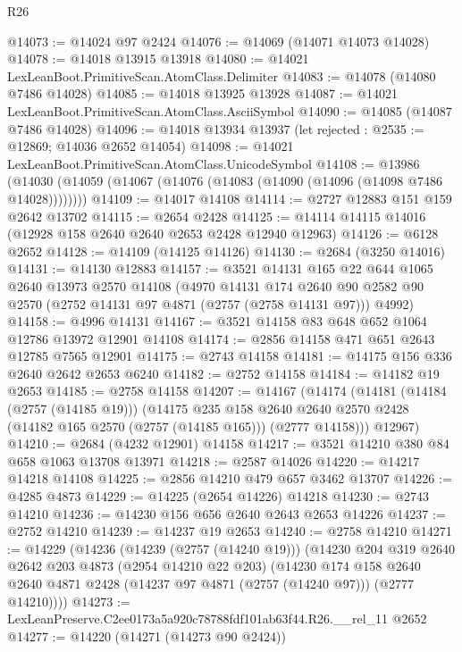 \begin{lexlean}{R26}
\begin{coremodule}
@14073 := @14024 @97 @2424
@14076 := @14069 (@14071 @14073 @14028)
@14078 := @14018 @13915 @13918
@14080 := @14021 LexLeanBoot.PrimitiveScan.AtomClass.Delimiter
@14083 := @14078 (@14080 @7486 @14028)
@14085 := @14018 @13925 @13928
@14087 := @14021 LexLeanBoot.PrimitiveScan.AtomClass.AsciiSymbol
@14090 := @14085 (@14087 @7486 @14028)
@14096 := @14018 @13934 @13937 (let rejected : @2535 := @12869; @14036 @2652 @14054)
@14098 := @14021 LexLeanBoot.PrimitiveScan.AtomClass.UnicodeSymbol
@14108 := @13986
    (@14030 (@14059 (@14067 (@14076 (@14083 (@14090 (@14096 (@14098 @7486 @14028))))))))
@14109 := @14017 @14108
@14114 := @2727 @12883 @151 @159 @2642 @13702
@14115 := @2654 @2428
@14125 := @14114 @14115 @14016 (@12928 @158 @2640 @2640 @2653 @2428 @12940 @12963)
@14126 := @6128 @2652
@14128 := @14109 (@14125 @14126)
@14130 := @2684 (@3250 @14016)
@14131 := @14130 @12883
@14157 := @3521
    @14131
    @165
    @22
    @644
    @1065
    @2640
    @13973
    @2570
    @14108
    (@4970
      @14131
      @174
      @2640
      @90
      @2582
      @90
      @2570
      (@2752 @14131 @97 @4871 (@2757 (@2758 @14131 @97)))
      @4992)
@14158 := @4996 @14131
@14167 := @3521 @14158 @83 @648 @652 @1064 @12786 @13972 @12901 @14108
@14174 := @2856 @14158 @471 @651 @2643 @12785 @7565 @12901
@14175 := @2743 @14158
@14181 := @14175 @156 @336 @2640 @2642 @2653 @6240
@14182 := @2752 @14158
@14184 := @14182 @19 @2653
@14185 := @2758 @14158
@14207 := @14167
    (@14174
      (@14181
        (@14184 (@2757 (@14185 @19)))
        (@14175
          @235
          @158
          @2640
          @2640
          @2570
          @2428
          (@14182 @165 @2570 (@2757 (@14185 @165)))
          (@2777 @14158)))
      @12967)
@14210 := @2684 (@4232 @12901) @14158
@14217 := @3521 @14210 @380 @84 @658 @1063 @13708 @13971
@14218 := @2587 @14026
@14220 := @14217 @14218 @14108
@14225 := @2856 @14210 @479 @657 @3462 @13707
@14226 := @4285 @4873
@14229 := @14225 (@2654 @14226) @14218
@14230 := @2743 @14210
@14236 := @14230 @156 @656 @2640 @2643 @2653 @14226
@14237 := @2752 @14210
@14239 := @14237 @19 @2653
@14240 := @2758 @14210
@14271 := @14229
    (@14236
      (@14239 (@2757 (@14240 @19)))
      (@14230
        @204
        @319
        @2640
        @2642
        @203
        @4873
        (@2954 @14210 @22 @203)
        (@14230
          @174
          @158
          @2640
          @2640
          @4871
          @2428
          (@14237 @97 @4871 (@2757 (@14240 @97)))
          (@2777 @14210))))
@14273 := LexLeanPreserve.C2ee0173a5a920c78788fdf101ab63f44.R26.__rel_11 @2652
@14277 := @14220 (@14271 (@14273 @90 @2424))

\end{coremodule}
\end{lexlean}
